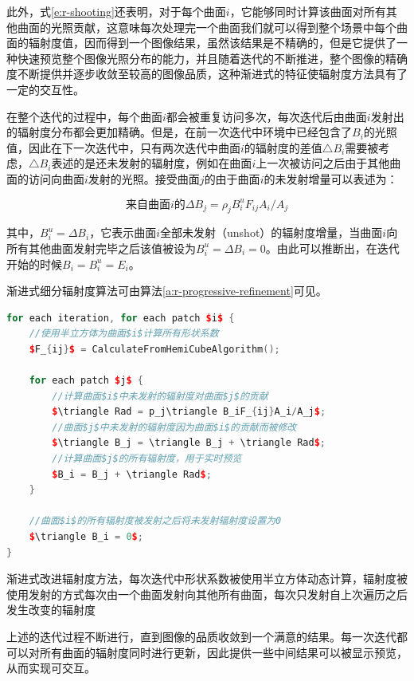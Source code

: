 此外，式\ref{e:r-shooting}还表明，对于每个曲面$i$，它能够同时计算该曲面对所有其他曲面的光照贡献，这意味每次处理完一个曲面我们就可以得到整个场景中每个曲面的辐射度值，因而得到一个图像结果，虽然该结果是不精确的，但是它提供了一种快速预览整个图像光照分布的能力，并且随着迭代的不断推进，整个图像的精确度不断提供并逐步收敛至较高的图像品质，这种渐进式的特征使辐射度方法具有了一定的交互性。

在整个迭代的过程中，每个曲面$i$都会被重复访问多次，每次迭代后由曲面$i$发射出的辐射度分布都会更加精确。但是，在前一次迭代中环境中已经包含了$B_i$的光照值，因此在下一次迭代中，只有两次迭代中曲面$i$的辐射度的差值$\triangle B_i$需要被考虑，$\triangle B_i$表述的是还未发射的辐射度，例如在曲面$i$上一次被访问之后由于其他曲面的访问向曲面$i$发射的光照。接受曲面$j$的由于曲面$i$的未发射增量可以表述为：

\begin{equation}\label{e:r-shooting}
	\text{来自曲面$i$的}\Delta B_j=\rho_j B^{u}_i F_{ij}A_i/A_j
\end{equation}

\noindent 其中，$B^{u}_i=\Delta B_i$，它表示曲面$i$全部未发射（unshot）的辐射度增量，当曲面$i$向所有其他曲面发射完毕之后该值被设为$B^{u}_i=\Delta B_i=0$。由此可以推断出，在迭代开始的时候$B_i=B^{u}_i=E_i$。

渐进式细分辐射度算法可由算法\ref{a:r-progressive-refinement}可见。

\begin{algorithm}
\begin{lstlisting}[language=C++, mathescape]
for each iteration, for each patch $i$ {
	//使用半立方体为曲面$i$计算所有形状系数
	$F_{ij}$ = CalculateFromHemiCubeAlgorithm();
	
	for each patch $j$ {
		//计算曲面$i$中未发射的辐射度对曲面$j$的贡献
		$\triangle Rad = p_j\triangle B_iF_{ij}A_i/A_j$;
		//曲面$j$中未发射的辐射度因为曲面$i$的贡献而被修改
		$\triangle B_j = \triangle B_j + \triangle Rad$; 
		//计算曲面$j$的所有辐射度，用于实时预览
		$B_i = B_j + \triangle Rad$; 
	}
	
	//曲面$i$的所有辐射度被发射之后将未发射辐射度设置为0
	$\triangle B_i = 0$; 
}
\end{lstlisting}
\caption{渐进式改进辐射度方法，每次迭代中形状系数被使用半立方体动态计算，辐射度被使用发射的方式每次由一个曲面发射向其他所有曲面，每次只发射自上次遍历之后发生改变的辐射度}
\label{a:r-progressive-refinement}
\end{algorithm}

上述的迭代过程不断进行，直到图像的品质收敛到一个满意的结果。每一次迭代都可以对所有曲面的辐射度同时进行更新，因此提供一些中间结果可以被显示预览，从而实现可交互。





